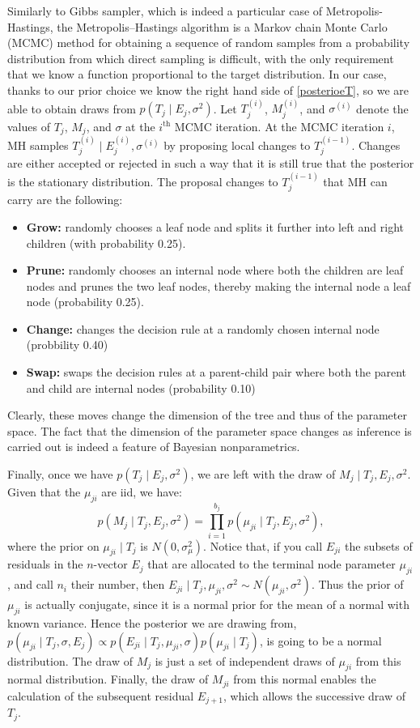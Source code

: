\documentclass[a4paper,11pt]{article}
\begin{document}
Similarly to Gibbs sampler, which is indeed a particular case of Metropolis-Hastings, the Metropolis–Hastings algorithm is a Markov chain Monte Carlo (MCMC) method for obtaining a sequence of random samples from a probability distribution from which direct sampling is difficult, with the only requirement that we know a function proportional to the target distribution. In our case, thanks to our prior choice we know the right hand side of \eqref{posterioeT}, so we are able to obtain draws from $p(T_j \mid E_j, \sigma^2)$. Let \( T_j^{(i)} \), \( M_j^{(i)} \), and \( \sigma^{(i)} \) denote the values of \( T_j \), \( M_j \), and \( \sigma \) at the \( i^\text{th} \) MCMC iteration. At the MCMC iteration $i$, MH samples $T_j^{(i)} \mid E_j^{(i)}, \sigma^{(i)}$ by proposing local changes to $T_j^{(i-1)}$. Changes are either accepted or rejected in such a way that it is still true that the posterior is the stationary distribution. 
The proposal changes to $T_j^{(i-1)}$ that MH can carry are the following: 
\begin{itemize}
    \item \textbf{Grow:} randomly chooses a leaf node and splits it further into left and right children (with probability 0.25). 
    \item \textbf{Prune:} randomly chooses an internal node where both the children are leaf nodes and prunes the two leaf nodes, thereby making the internal node a leaf node (probability 0.25). 
    \item \textbf{Change:} changes the decision rule at a randomly chosen internal node (probbility 0.40)
    \item \textbf{Swap:} swaps the decision rules at a parent-child pair where both the parent and child are internal nodes (probability 0.10)
    \end{itemize}
    Clearly, these moves change the dimension of the tree and thus of the parameter space. The fact that the dimension of the parameter space changes as inference is carried out is indeed a feature of Bayesian nonparametrics. 

Finally, once we have $p(T_j \mid E_j, \sigma^2)$, we are left with the draw of $M_j \mid T_j, E_j, \sigma^2$. Given that the $\mu_{ji}$ are iid, we have: 
$$ p(M_j \mid T_j, E_j, \sigma^2) = \prod_{i=1}^{b_j} p(\mu_{ji} \mid T_j, E_j, \sigma^2),
$$ where the prior on $\mu_{ji} \mid T_j$ is  $N(0, \sigma_\mu^2)$. Notice that, if you call  \( E_{ji} \) the subsets of residuals in the $n$-vector  $E_j$ that are allocated to the terminal node parameter  \( \mu_{ji} \), and call \( n_i \) their number, then \( E_{ji} \mid T_j, \mu_{ji}, \sigma^2 \sim N(\mu_{ji}, \sigma^2) \). Thus the prior of $\mu_{ji}$ is actually conjugate, since it is a normal prior for the mean of a normal with known variance. Hence the posterior we are drawing from, $p(\mu_{ji} \mid T_j, \sigma, E_j) \propto p(E_{ji} \mid T_j, \mu_{ji}, \sigma) p(\mu_{ji} \mid T_j)$, is going to be a normal distribution. The draw of \( M_j \) is just a set of independent draws of $\mu_{ji}$ from this normal distribution. 
Finally, the draw of $M_{ji}$  from this normal enables the calculation of the subsequent residual \( E_{j+1} \), which allows the successive draw of \( T_j \). 
\end{document}

